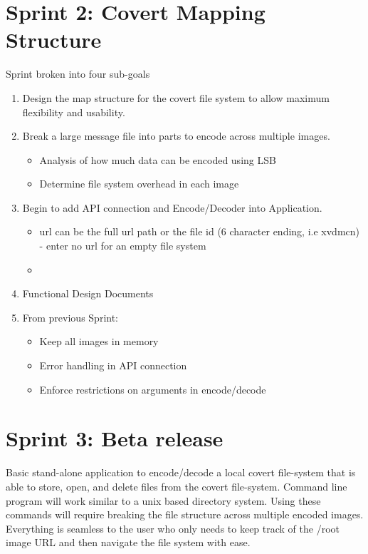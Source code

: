 \documentclass[letterpaper,12pt,openany,oneside]{sphinxmanual}
\begin{document}
\section{Sprint 2: Covert Mapping Structure}
\label{index:sprint-2-covert-mapping-structure}
Sprint broken into four sub-goals
\begin{enumerate}
\item {} 
Design the map structure for the covert file system to allow maximum flexibility and usability.

\item {} 
Break a large message file into parts to encode across multiple images.
\begin{itemize}
\item {} 
Analysis of how much data can be encoded using LSB

\item {} 
Determine file system overhead in each image

\end{itemize}

\item {} 
Begin to add API connection and Encode/Decoder into Application.
\begin{itemize}
\item {} 
 url can be the full url path or the file id (6 character ending, i.e xvdmcn)
- enter no url for an empty file system

\item {} 

\end{itemize}

\item {} 
Functional Design Documents

\item {} 
From previous Sprint:
\begin{itemize}
\item {} 
Keep all images in memory

\item {} 
Error handling in API connection

\item {} 
Enforce restrictions on arguments in encode/decode

\end{itemize}

\end{enumerate}


\section{Sprint 3: Beta release}
\label{index:sprint-3-beta-release}
Basic stand-alone application to encode/decode a local covert file-system that is able to store, open, and delete files from the covert file-system. Command line program will work similar to a unix based directory system. Using these commands will require breaking the file structure across multiple encoded images. Everything is seamless to the user who only needs to keep track of the /root image URL and then navigate the file system with ease.
\end{document}
